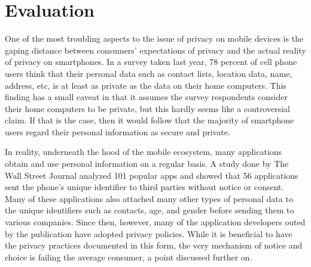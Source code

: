 \section{Evaluation}



One of the most troubling aspects to the issue of privacy on mobile devices is the gaping distance between consumers' expectations of privacy and the actual reality of privacy on smartphones. In a survey taken last year, 78 percent of cell phone users think that their personal data such as contact lists, location data, name, address, etc, is at least as private as the data on their home computers\cite{Jenn2012}. This finding has a small caveat in that it assumes the survey respondents consider their home computers to be private, but this hardly seems like a controversial claim. If that is the case, then it would follow that the majority of smartphone users regard their personal information as secure and private. 


In reality, underneath the hood of the mobile ecosystem, many applications obtain and use personal information on a regular basis. 
A study done by The Wall Street Journal analyzed 101 popular apps and showed that 56 applications sent the phone's unique identifier to third parties without notice or consent\cite{Thru2010}. Many of these applications also attached many other types of personal data to the unique identifiers such as contacts, age, and gender before sending them to various companies. Since then, however, many of the application developers outed by the publication have adopted privacy policies. While it is beneficial to have the privacy practices documented in this form, the very mechanism of notice and choice is failing the average consumer, a point discussed further on. 


